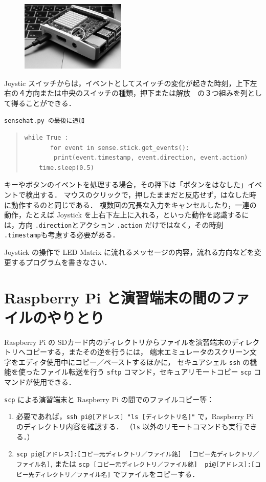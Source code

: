 \documentclass[11pt,a4,epsf]{report}
\begin{document}
\begin{figure}
\centering
\includegraphics[width=5cm]{joystick.jpg}
\end{figure}

Joystic スイッチからは，イベントとしてスイッチの変化が起きた時刻，上下左右の４方向または中央のスイッチの種類，押下または解放　の３つ組みを列として得ることができる．
\begin{itembox}[l]{\tt sensehat.py の最後に追加}
\begin{quote}
\small
\begin{verbatim}
while True :
       for event in sense.stick.get_events():
        print(event.timestamp, event.direction, event.action)
    time.sleep(0.5)
\end{verbatim}
\end{quote}
\end{itembox}
キーやボタンのイベントを処理する場合，その押下は「ボタンをはなした」イベントで検出する．
マウスのクリックで，押したままだと反応せず，はなした時に動作するのと同じである．
複数回の冗長な入力をキャンセルしたり，一連の動作，たとえば Joystick を上右下左上に入れる，といった動作を認識するには，方向 \verb+.direction+とアクション \verb+.action+ だけではなく，その時刻 \verb+.timestamp+も考慮する必要がある．

\begin{excercise}
Joystick の操作で LED Matrix に流れるメッセージの内容，流れる方向などを変更するプログラムを書きなさい．
\end{excercise}


\section{Raspberry Pi と演習端末の間のファイルのやりとり}

Raspberry Pi の SDカード内のディレクトリからファイルを演習端末のディレクトリへコピーする，またその逆を行うには，
端末エミュレータのスクリーン文字をエディタ使用中にコピー／ペーストするほかに，
セキュアシェル \verb+ssh+ の機能を使ったファイル転送を行う \verb+sftp+ コマンド，セキュアリモートコピー \verb+scp+ コマンドが使用できる．

\verb+scp+ による演習端末と Raspberry Pi の間でのファイルコピー等：
\begin{enumerate}
\item
必要であれば，\verb+ssh pi@[アドレス] "ls [ディレクトリ名]"+ で，Raspberry Pi のディレクトリ内容を確認する．
（\verb+ls+ 以外のリモートコマンドも実行できる．）
\item
\verb+scp pi@[アドレス]:[コピー元ディレクトリ／ファイル銘]  [コピー先ディレクトリ／ファイル名]+, または
\verb+scp [コピー元ディレクトリ／ファイル銘]  pi@[アドレス]:[コピー先ディレクトリ／ファイル名]+ でファイルをコピーする．
\end{enumerate}
\end{document}
